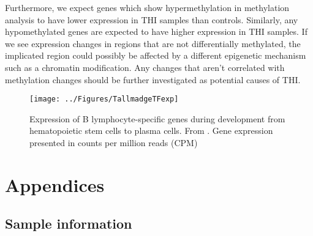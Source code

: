 \documentclass[12pt]{article}
\begin{document}
			Furthermore, we expect genes which show hypermethylation in methylation analysis to have lower expression in THI samples than controls. 
			Similarly, any hypomethylated genes are expected to have higher expression in THI samples.
			If we see expression changes in regions that are not differentially methylated, the implicated region could possibly be affected by a different epigenetic mechanism such as a chromatin modification.
			Any changes that aren't correlated with methylation changes should be further investigated as potential causes of THI.
			
			\begin{figure}
				\centering
				\texttt{[image: ../Figures/TallmadgeTFexp]}
				\caption{Expression of B lymphocyte-specific genes during development from hematopoietic stem cells to plasma cells. From \citet{Tallmadge15}. Gene expression presented in counts per million reads (CPM)}
				\label{fig:TallTFexp}
			\end{figure}
			
			
					\appendix
					\section{Appendices}
					
					\subsection{Sample information}
\end{document}
